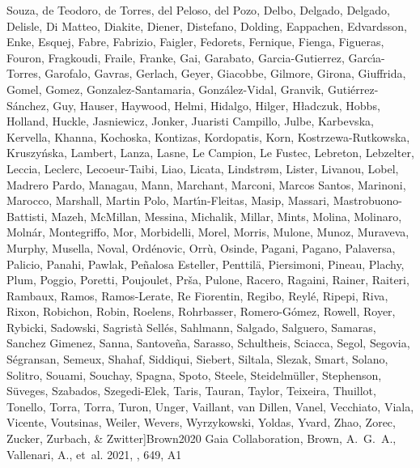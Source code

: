 \documentclass[longauth]{aa} %
\begin{document}
\begin{thebibliography}{112}
{{			Souza}, {de Teodoro}, {de Torres}, {del Peloso}, {del Pozo}, {Delbo},
		{Delgado}, {Delgado}, {Delisle}, {Di Matteo}, {Diakite}, {Diener},
		{Distefano}, {Dolding}, {Eappachen}, {Edvardsson}, {Enke}, {Esquej}, {Fabre},
		{Fabrizio}, {Faigler}, {Fedorets}, {Fernique}, {Fienga}, {Figueras},
		{Fouron}, {Fragkoudi}, {Fraile}, {Franke}, {Gai}, {Garabato},
		{Garcia-Gutierrez}, {Garc{\'\i}a-Torres}, {Garofalo}, {Gavras}, {Gerlach},
		{Geyer}, {Giacobbe}, {Gilmore}, {Girona}, {Giuffrida}, {Gomel}, {Gomez},
		{Gonzalez-Santamaria}, {Gonz{\'a}lez-Vidal}, {Granvik},
		{Guti{\'e}rrez-S{\'a}nchez}, {Guy}, {Hauser}, {Haywood}, {Helmi}, {Hidalgo},
		{Hilger}, {H{\l}adczuk}, {Hobbs}, {Holland}, {Huckle}, {Jasniewicz},
		{Jonker}, {Juaristi Campillo}, {Julbe}, {Karbevska}, {Kervella}, {Khanna},
		{Kochoska}, {Kontizas}, {Kordopatis}, {Korn}, {Kostrzewa-Rutkowska},
		{Kruszy{\'n}ska}, {Lambert}, {Lanza}, {Lasne}, {Le Campion}, {Le Fustec},
		{Lebreton}, {Lebzelter}, {Leccia}, {Leclerc}, {Lecoeur-Taibi}, {Liao},
		{Licata}, {Lindstr{\o}m}, {Lister}, {Livanou}, {Lobel}, {Madrero Pardo},
		{Managau}, {Mann}, {Marchant}, {Marconi}, {Marcos Santos}, {Marinoni},
		{Marocco}, {Marshall}, {Martin Polo}, {Mart{\'\i}n-Fleitas}, {Masip},
		{Massari}, {Mastrobuono-Battisti}, {Mazeh}, {McMillan}, {Messina},
		{Michalik}, {Millar}, {Mints}, {Molina}, {Molinaro}, {Moln{\'a}r},
		{Montegriffo}, {Mor}, {Morbidelli}, {Morel}, {Morris}, {Mulone}, {Munoz},
		{Muraveva}, {Murphy}, {Musella}, {Noval}, {Ord{\'e}novic}, {Orr{\`u}},
		{Osinde}, {Pagani}, {Pagano}, {Palaversa}, {Palicio}, {Panahi}, {Pawlak},
		{Pe{\~n}alosa Esteller}, {Penttil{\"a}}, {Piersimoni}, {Pineau}, {Plachy},
		{Plum}, {Poggio}, {Poretti}, {Poujoulet}, {Pr{\v{s}}a}, {Pulone}, {Racero},
		{Ragaini}, {Rainer}, {Raiteri}, {Rambaux}, {Ramos}, {Ramos-Lerate}, {Re
			Fiorentin}, {Regibo}, {Reyl{\'e}}, {Ripepi}, {Riva}, {Rixon}, {Robichon},
		{Robin}, {Roelens}, {Rohrbasser}, {Romero-G{\'o}mez}, {Rowell}, {Royer},
		{Rybicki}, {Sadowski}, {Sagrist{\`a} Sell{\'e}s}, {Sahlmann}, {Salgado},
		{Salguero}, {Samaras}, {Sanchez Gimenez}, {Sanna}, {Santove{\~n}a},
		{Sarasso}, {Schultheis}, {Sciacca}, {Segol}, {Segovia}, {S{\'e}gransan},
		{Semeux}, {Shahaf}, {Siddiqui}, {Siebert}, {Siltala}, {Slezak}, {Smart},
		{Solano}, {Solitro}, {Souami}, {Souchay}, {Spagna}, {Spoto}, {Steele},
		{Steidelm{\"u}ller}, {Stephenson}, {S{\"u}veges}, {Szabados}, {Szegedi-Elek},
		{Taris}, {Tauran}, {Taylor}, {Teixeira}, {Thuillot}, {Tonello}, {Torra},
		{Torra}, {Turon}, {Unger}, {Vaillant}, {van Dillen}, {Vanel}, {Vecchiato},
		{Viala}, {Vicente}, {Voutsinas}, {Weiler}, {Wevers}, {Wyrzykowski}, {Yoldas},
		{Yvard}, {Zhao}, {Zorec}, {Zucker}, {Zurbach}, \& {Zwitter}}]{Brown2020}
	{Gaia Collaboration}, {Brown}, A.~G.~A., {Vallenari}, A., {et~al.} 2021, \aap,
	649, A1
	

\end{thebibliography}
\end{document}
